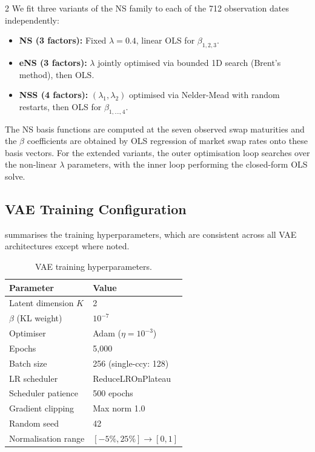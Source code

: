 \documentclass[10pt,a4paper]{article}
\theoremstyle{plain}
\theoremstyle{definition}
\begin{document}
\begin{multicols}{2}
We fit three variants of the NS family to each of the 712 observation dates independently:
\begin{itemize}[nosep]
\item \textbf{NS (3 factors):} Fixed $\lambda = 0.4$, linear OLS for $\beta_{1,2,3}$.
\item \textbf{eNS (3 factors):} $\lambda$ jointly optimised via bounded 1D search (Brent's method), then OLS.
\item \textbf{NSS (4 factors):} $(\lambda_1, \lambda_2)$ optimised via Nelder-Mead with random restarts, then OLS for $\beta_{1,\ldots,4}$.
\end{itemize}
The NS basis functions are computed at the seven observed swap maturities and the $\beta$ coefficients are obtained by OLS regression of market swap rates onto these basis vectors. For the extended variants, the outer optimisation loop searches over the non-linear $\lambda$ parameters, with the inner loop performing the closed-form OLS solve.

\subsection{VAE Training Configuration}

 summarises the training hyperparameters, which are consistent across all VAE architectures except where noted.

\begin{table}[H]
\centering
\caption{VAE training hyperparameters.}\label{tab:training_config}
\begin{tabular}{ll}
\toprule
Parameter & Value \\
\midrule
Latent dimension $K$ & 2 \\
$\beta$ (KL weight) & $10^{-7}$ \\
Optimiser & Adam ($\eta = 10^{-3}$) \\
Epochs & 5{,}000 \\
Batch size & 256 (single-ccy: 128) \\
LR scheduler & ReduceLROnPlateau \\
Scheduler patience & 500 epochs \\
Gradient clipping & Max norm 1.0 \\
Random seed & 42 \\
Normalisation range & $[-5\%, 25\%] \to [0, 1]$ \\
\bottomrule
\end{tabular}
\end{table}


\end{multicols}
\end{document}
